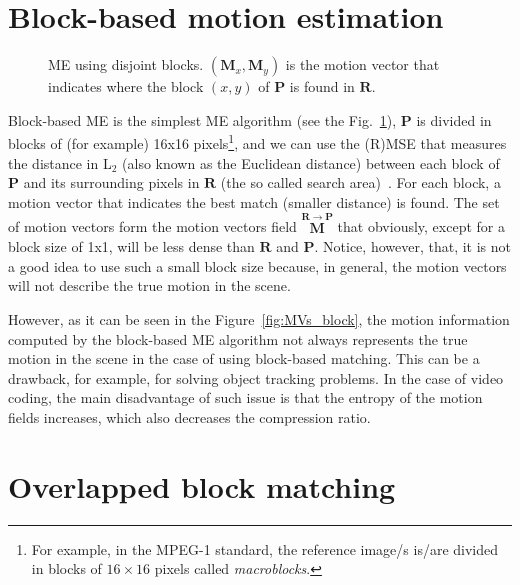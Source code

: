 

\section{Block-based motion estimation~\cite{rao1996techniques}}

\begin{figure}
  \centering
  \caption{ME using disjoint blocks. $({\mathbf M}_x, {\mathbf M}_y)$
    is the motion vector that indicates where the block $(x,y)$ of
    ${\mathbf P}$ is found in ${\mathbf R}$.}
  \label{fig:simple}
\end{figure}

Block-based ME is the simplest ME algorithm (see the
Fig.~\ref{fig:simple}), ${\mathbf P}$ is divided in blocks of (for
example) 16x16 pixels\footnote{For example, in the MPEG-1 standard,
  the reference image/s is/are divided in blocks of $16\times 16$
  pixels called \emph{macroblocks}.}, and we can use the (R)MSE that
measures the distance in L$_2$ (also known as the Euclidean distance)
between each block of ${\mathbf P}$ and its surrounding pixels in
${\mathbf R}$ (the so called search area)~\cite{zhu2000new}. For each
block, a motion vector that indicates the best match (smaller
distance) is found. The set of motion vectors form the motion vectors
field $\overset{{\mathbf R}\rightarrow {\mathbf P}}{\mathbf M}$ that
obviously, except for a block size of 1x1, will be less dense than
${\mathbf R}$ and ${\mathbf P}$. Notice, however, that, it is not a
good idea to use such a small block size because, in general, the
motion vectors will not describe the true motion in the scene.

However, as it can be seen in the Figure~\ref{fig:MVs_block}, the
motion information computed by the block-based ME algorithm not always
represents the true motion in the scene in the case of using
block-based matching. This can be a drawback, for example, for solving
object tracking problems. In the case of video coding, the main
disadvantage of such issue is that the entropy of the motion fields
increases, which also decreases the compression ratio.


\section{Overlapped block matching}


